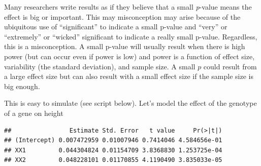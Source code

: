 \documentclass[]{book}
\newenvironment{Shaded}{\begin{snugshade}}{\end{snugshade}}
\newcommand{\DataTypeTok}[1]{\textcolor[rgb]{0.13,0.29,0.53}{#1}}
\newcommand{\DecValTok}[1]{\textcolor[rgb]{0.00,0.00,0.81}{#1}}
\newcommand{\FloatTok}[1]{\textcolor[rgb]{0.00,0.00,0.81}{#1}}
\newcommand{\KeywordTok}[1]{\textcolor[rgb]{0.13,0.29,0.53}{\textbf{#1}}}
\newcommand{\NormalTok}[1]{#1}
\newcommand{\OperatorTok}[1]{\textcolor[rgb]{0.81,0.36,0.00}{\textbf{#1}}}
\newcommand{\StringTok}[1]{\textcolor[rgb]{0.31,0.60,0.02}{#1}}
\begin{document}
Many researchers write results as if they believe that a small \emph{p}-value means the effect is big or important. This may misconception may arise because of the ubiquitous use of ``significant'' to indicate a small p-value and ``very'' or ``extremely'' or ``wicked'' significant to indicate a really small p-value. Regardless, this is a misconception. A small p-value will usually result when there is high power (but can occur even if power is low) and power is a function of effect size, variability (the standard deviation), and sample size. A small \(p\) could result from a large effect size but can also result with a small effect size if the sample size is big enough.

This is easy to simulate (see script below). Let's model the effect of the genotype of a gene on height

\begin{Shaded}
\end{Shaded}

\begin{verbatim}
##                Estimate Std. Error   t value     Pr(>|t|)
## (Intercept) 0.007472959 0.01007946 0.7414046 4.584656e-01
## XX1         0.044304824 0.01154709 3.8368830 1.253725e-04
## XX2         0.048228101 0.01170855 4.1190490 3.835033e-05
\end{verbatim}
\end{document}
